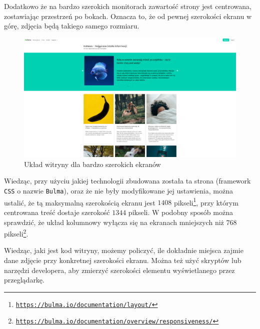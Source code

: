 \documentclass[licencjacka]{pracadypl}
\begin{document}
Dodatkowo że na bardzo szerokich monitorach zawartość strony jest centrowana, zostawiając przestrzeń po bokach. Oznacza to, że od pewnej szerokości ekranu w górę, zdjęcia będą takiego samego rozmiaru. 

\begin{figure}[H]
  \includegraphics[width=\linewidth]{images/screenshot-very-wide.png}
  \caption{Układ witryny dla bardzo szerokich ekranów}
  \label{fig:screenshot-verywide}
\end{figure}

Wiedząc, przy użyciu jakiej technologii zbudowana została ta strona (framework \texttt{CSS} o nazwie \texttt{Bulma}), oraz że nie były modyfikowane jej ustawienia, można ustalić, że tą maksymalną szerokością ekranu jest $1408$ pikseli\footnote{\href{https://web.archive.org/web/20230518134357/https://bulma.io/documentation/layout/}{\texttt{https://bulma.io/documentation/layout/}}}, przy którym centrowana treść dostaje szerokość $1344$ pikseli. W podobny sposób można sprawdzić, że układ kolumnowy wyłącza się na ekranach mniejszych niż $768$ pikseli\footnote{\href{https://web.archive.org/web/20230512141342/https://bulma.io/documentation/overview/responsiveness/}{\texttt{https://bulma.io/documentation/overview/responsiveness/}}}.

Wiedząc, jaki jest kod witryny, możemy policzyć, ile dokładnie miejsca zajmie dane zdjęcie przy konkretnej szerokości ekranu. Można też użyć skryptów lub narzędzi developera, aby zmierzyć szerokości elementu wyświetlanego przez przeglądarkę.
\end{document}
